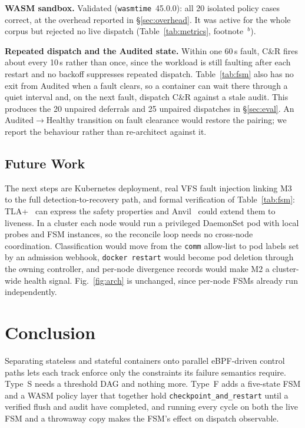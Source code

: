 \documentclass[conference]{IEEEtran}
\begin{document}
\textbf{WASM sandbox.} Validated (\texttt{wasmtime}~45.0.0): all 20 isolated policy cases correct, at the overhead reported in \S\ref{sec:overhead}. It was active for the whole corpus but rejected no live dispatch (Table~\ref{tab:metrics}, footnote~$^{b}$).

\textbf{Repeated dispatch and the Audited state.} Within one 60\,s fault, C\&R fires about every 10\,s rather than once, since the workload is still faulting after each restart and no backoff suppresses repeated dispatch. Table~\ref{tab:fsm} also has no exit from Audited when a fault clears, so a container can wait there through a quiet interval and, on the next fault, dispatch C\&R against a stale audit. This produces the 20 unpaired deferrals and 25 unpaired dispatches in \S\ref{sec:eval}. An Audited$\rightarrow$Healthy transition on fault clearance would restore the pairing; we report the behaviour rather than re-architect against it.

\subsection{Future Work}

The next steps are Kubernetes deployment, real VFS fault injection linking M3 to the full detection-to-recovery path, and formal verification of Table~\ref{tab:fsm}: TLA+~\cite{b9} can express the safety properties and Anvil~\cite{b13} could extend them to liveness. In a cluster each node would run a privileged DaemonSet pod with local probes and FSM instances, so the reconcile loop needs no cross-node coordination. Classification would move from the \texttt{comm} allow-list to pod labels set by an admission webhook, \texttt{docker restart} would become pod deletion through the owning controller, and per-node divergence records would make M2 a cluster-wide health signal. Fig.~\ref{fig:arch} is unchanged, since per-node FSMs already run independently.


\section{Conclusion}
\label{sec:conclusion}

Separating stateless and stateful containers onto parallel eBPF-driven control paths lets each track enforce only the constraints its failure semantics require. Type~S needs a threshold DAG and nothing more. Type~F adds a five-state FSM and a WASM policy layer that together hold \texttt{checkpoint\_and\_restart} until a verified flush and audit have completed, and running every cycle on both the live FSM and a throwaway copy makes the FSM's effect on dispatch observable.
\end{document}
